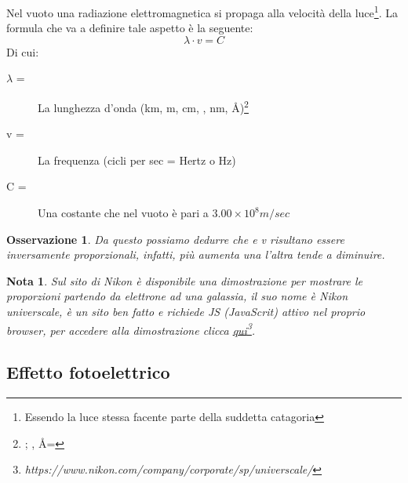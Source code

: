 \documentclass{book}
\newtheorem{nota}{Nota}[section]
\newtheorem{oss}{Osservazione}[section]
\begin{document}
Nel vuoto una radiazione elettromagnetica si propaga alla velocità della luce\footnote{Essendo la luce
  stessa facente parte della suddetta catagoria}. La formula che va a definire tale aspetto è la seguente:
\begin{equation}
  \label{eq:veldiunaradelect}
  \lambda\cdot v=C
\end{equation}
Di cui:
\begin{description}
\item[$\lambda$ =] La lunghezza d'onda (km, m, cm, , nm, Å)\footnote{; , Å=}
\item[v =] La frequenza (cicli per sec = Hertz o Hz)
\item[C =] Una costante che nel vuoto è pari a $3.00\times 10^8 m/sec$
\end{description}
\clearpage
\begin{oss}
  Da questo possiamo dedurre che \ce{\lambda} e v risultano essere inversamente proporzionali, infatti,
  più aumenta una l'altra tende a diminuire.
\end{oss}
\begin{nota}
  Sul sito di Nikon è disponibile una dimostrazione per mostrare le proporzioni partendo da elettrone
  ad una galassia, il suo nome è Nikon universcale, è un sito ben fatto e richiede JS (JavaScrit)
  attivo nel proprio browser, per accedere alla dimostrazione clicca
  \href{https://www.nikon.com/company/corporate/sp/universcale/}{qui}\footnote{https://www.nikon.com/company/corporate/sp/universcale/}.
\end{nota}

\subsection{Effetto fotoelettrico}
\label{sec:effettofotoelettrico}
\end{document}
